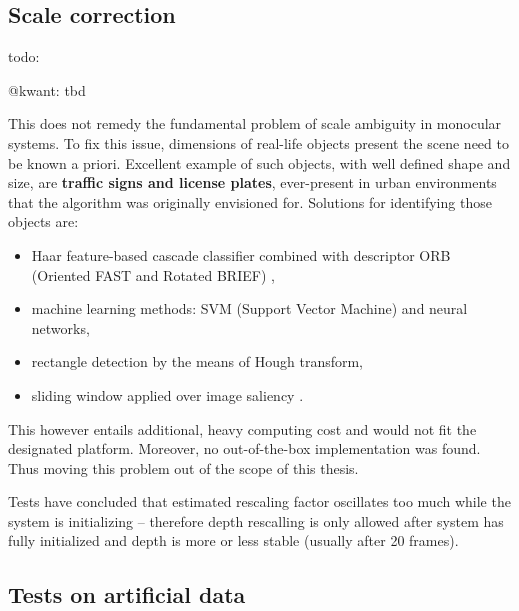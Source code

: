\subsection{Scale correction}

 
 todo:
 
 @kwant: tbd



This does not remedy the fundamental problem of scale ambiguity in monocular systems. To fix this issue, dimensions of real-life objects present the scene need to be known a priori. Excellent example of such objects, with well defined shape and size, are \textbf{traffic signs and license plates}, ever-present in urban environments that the algorithm was originally envisioned for. Solutions for identifying those objects are:
\begin{itemize}
	\item Haar feature-based cascade classifier combined with descriptor ORB (Oriented FAST and Rotated BRIEF) \cite{opencv},
	\item machine learning methods: SVM (Support Vector Machine) and neural networks,
	\item rectangle detection by the means of Hough transform,
	\item sliding window applied over image saliency \cite{lin2010robust}.
\end{itemize}

This however entails additional, heavy computing cost and would not fit the designated platform. Moreover, no out-of-the-box implementation was found. Thus moving this problem out of the scope of this thesis.

Tests have concluded that estimated rescaling factor oscillates too much while the system is initializing -- therefore depth rescalling is only allowed after system has fully initialized and depth is more or less stable (usually after 20 frames).

\subsection{Tests on artificial data}

